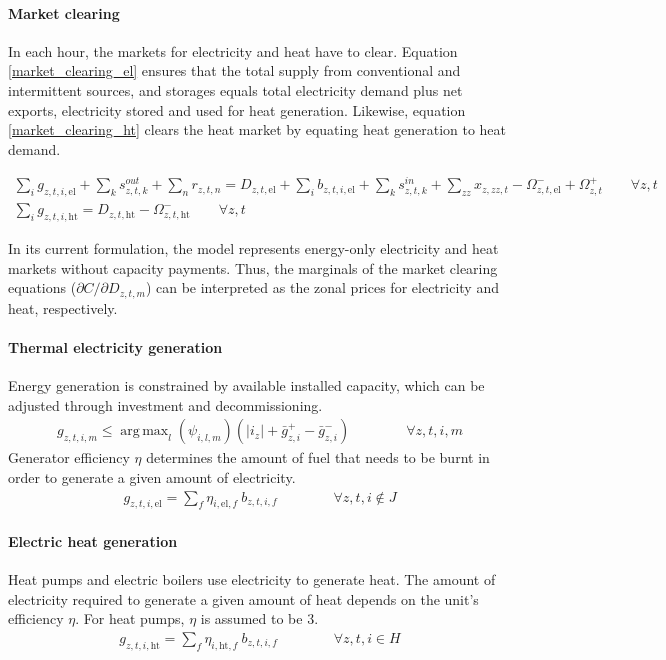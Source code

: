 \documentclass[11pt,a4paper]{article}
\DeclareMathOperator*{\argmax}{arg\,max}
\begin{document}
\paragraph{Market clearing}
In each hour, the markets for electricity and heat have to clear.
Equation \ref{market_clearing_el} ensures that the total supply from conventional and intermittent sources, and storages equals total electricity demand plus net exports, electricity stored and used for heat generation. 
Likewise, equation \ref{market_clearing_ht} clears the heat market by equating heat generation to heat demand.

\begin{align}
\sum_{i} g_{z,t,i,\text{el}} + \sum_{k} s^{out}_{z,t,k} + \sum_{n} r_{z,t,n} =
D_{z,t,\text{el}} + \sum_{i} b_{z,t,i,\text{el}} + \sum_{k} s^{in}_{z,t,k} + \sum_{zz} x_{z,zz,t} 
- \Omega^{-}_{z,t,\text{el}} + \Omega^{+}_{z,t} \qquad \forall z,t \label{market_clearing_el} \\
\sum_{i} g_{z,t,i,\text{ht}} = D_{z,t,\text{ht}} - \Omega^{-}_{z,t,\text{ht}} \qquad \forall z,t \label{market_clearing_ht}
\end{align}

In its current formulation, the model represents energy-only electricity and heat markets without capacity payments. Thus, the marginals of the market clearing equations ($\partial C / \partial D_{z,t,m}$) can be interpreted as the zonal prices for electricity and heat, respectively.

\paragraph{Thermal electricity generation}
Energy generation is constrained by available installed capacity, which can be adjusted through investment and decommissioning.
\begin{align}
g_{z,t,i,m} \leq \argmax_{l}(\psi_{i,l,m}) \left( |i_{z}| + \bar{g}^{+}_{z,i} - \bar{g}^{-}_{z,i} \right) \qquad \qquad \forall z,t,i,m
\end{align}
Generator efficiency $\eta$ determines the amount of fuel that needs to be burnt in order to generate a given amount of electricity.
\begin{align}
g_{z,t,i,\text{el}} = \sum_{f} \eta_{i,\text{el},f} \: b_{z,t,i,f} \qquad \qquad \forall z,t,i \notin J
\end{align}

\paragraph{Electric heat generation}
Heat pumps and electric boilers use electricity to generate heat. The amount of electricity required to generate a given amount of heat depends on the unit's efficiency $\eta$. For heat pumps, $\eta$ is assumed to be $3$.
\begin{align}
g_{z,t,i,\text{ht}} = \sum_{f} \eta_{i,\text{ht},f} \: b_{z,t,i,f} \qquad \qquad \forall z,t,i \in H
\end{align}
\end{document}

